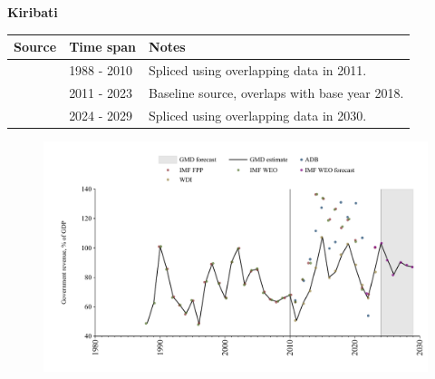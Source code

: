 \documentclass[12pt,a4paper,landscape]{article}
\begin{document}
\begin{adjustbox}{max totalsize={\paperwidth}{\paperheight},center}
\begin{minipage}[t][\textheight][t]{\textwidth}
\vspace*{0.5cm}
{}
\begin{center}
{\Large\bfseries Kiribati}
\end{center}
\vspace{0.5cm}
\begin{table}[H]
\centering
\small
\begin{tabular}{|l|l|l|}
\hline
\textbf{Source} & \textbf{Time span} & \textbf{Notes} \\
\hline
\rowcolor{white}\cite{IMF_WEO}& 1988 - 2010 &Spliced using overlapping data in 2011.\\
\rowcolor{lightgray}\cite{WDI}& 2011 - 2023 &Baseline source, overlaps with base year 2018.\\
\rowcolor{white}\cite{IMF_WEO_forecast}& 2024 - 2029 &Spliced using overlapping data in 2030.\\
\hline
\end{tabular}
\end{table}
\begin{figure}[H]
\centering
\includegraphics[width=\textwidth,height=0.6\textheight,keepaspectratio]{graphs/KIR_govrev_GDP.pdf}
\end{figure}
\end{minipage}
\end{adjustbox}
\end{document}

